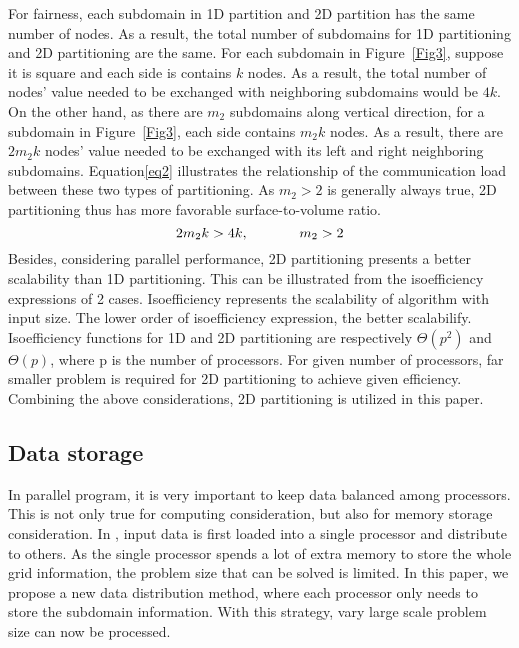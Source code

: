 \documentclass{sig-alternate}
\begin{document}
	For fairness, each subdomain in 1D partition and 2D partition has the same number
	of nodes. As a result, the total number of subdomains for 1D partitioning and 2D partitioning are the same. For each subdomain 
	in Figure~\ref{Fig3}, suppose it is square and each side is contains $k$ nodes. As a result, the total 
	number of nodes' value needed to be exchanged with neighboring subdomains would be $4k$. On the other hand, as 
	there are $m_2$ subdomains along vertical direction, for a subdomain in Figure~\ref{Fig3}, each side contains
	$m_2k$ nodes. As a result, there are $2m_2k$ nodes' value needed to be exchanged with its left and right 
	neighboring subdomains. Equation\eqref{eq2} illustrates the relationship of the communication load between these two types of
	partitioning. As $m_2>2$ is generally always true, 2D partitioning thus has more favorable surface-to-volume ratio.    
	\begin{equation}
		2m_2k > 4k, \hspace{0.5 in} m_2 > 2 \label{eq2}
	\end{equation}
	Besides, considering parallel performance, 2D partitioning presents a better scalability than 1D partitioning. This can be
	illustrated from the isoefficiency expressions of 2 cases. Isoefficiency represents the scalability of algorithm
	with input size. The lower order of isoefficiency expression, the better scalabilify. Isoefficiency functions for 1D 
	and 2D partitioning are respectively $\Theta(p^2)$ and $\Theta(p)$\cite{Grama, Kumar}, where p is the number of processors. 
	For given number of processors, far smaller problem is required for 2D partitioning to achieve given efficiency.\\

	Combining the above considerations, 2D partitioning is utilized in this paper.\\	
	  
  \subsection{Data storage}
	In parallel program, it is very important to keep data balanced among processors. This is not only true for computing
	consideration, but also for memory storage consideration. In \cite{Quming}, input data is first loaded into a single processor 
	and distribute to others. As the single processor spends a lot of extra memory to store the whole grid information,
	the problem size that can be solved is limited. In this paper, we propose a new data distribution method, where each processor
	only needs to store the subdomain information. With this strategy, vary large scale problem size can now be processed.\\
\end{document}

